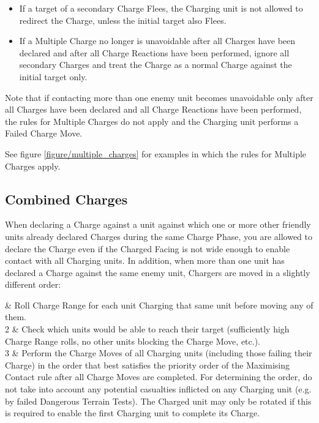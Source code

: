 \columnbreak

\begin{itemize}	
	\item If a target of a secondary Charge Flees, the Charging unit is not allowed to redirect the Charge, unless the initial target also Flees.
	\item If a Multiple Charge no longer is unavoidable after all Charges have been declared and after all Charge Reactions have been performed, ignore all secondary Charges and treat the Charge as a normal Charge against the initial target only.
\end{itemize}

\columnbreak

Note that if contacting more than one enemy unit becomes unavoidable only after all Charges have been declared and all Charge Reactions have been performed, the rules for Multiple Charges do not apply and the Charging unit performs a Failed Charge Move.

See figure \ref{figure/multiple_charges} for examples in which the rules for Multiple Charges apply.

\newpage
\subsection{Combined Charges}
\label{combined_charges}

When declaring a Charge against a unit against which one or more other friendly units already declared Charges during the same Charge Phase, you are allowed to declare the Charge even if the Charged Facing is not wide enough to enable contact with all Charging units. In addition, when more than one unit has declared a Charge against the same enemy unit, Chargers are moved in a slightly different order:

 & Roll Charge Range for each unit Charging that same unit before moving any of them.\\
	2 & Check which units would be able to reach their target (sufficiently high Charge Range rolls, no other units blocking the Charge Move, etc.).\\
	3 & Perform the Charge Moves of all Charging units (including those failing their Charge) in the order that best satisfies the priority order of the Maximising Contact rule after all Charge Moves are completed. For determining the order, do not take into account any potential casualties inflicted on any Charging unit (e.g. by failed Dangerous Terrain Tests). The Charged unit may only be rotated if this is required to enable the first Charging unit to complete its Charge.\\
\closeseqtablemc

